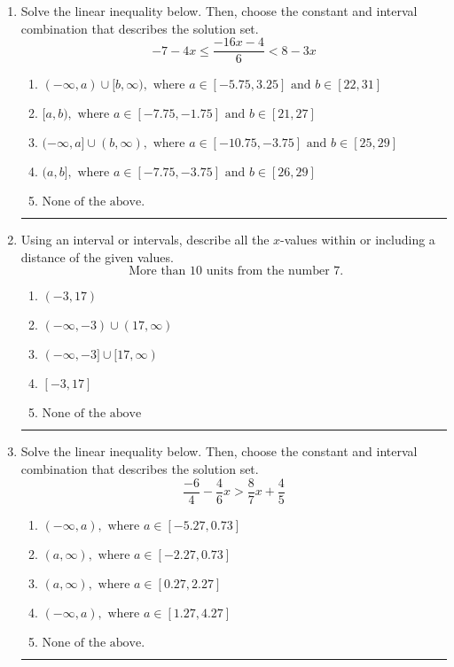 \documentclass[14pt]{extbook}
\newcommand{\litem}[1]{\item#1\hspace*{-1cm}\rule{\textwidth}{0.4pt}}
\begin{document}
\begin{enumerate}
{\begin{enumerate}[label=\Alph*.]
\end{enumerate} }
\litem{
Solve the linear inequality below. Then, choose the constant and interval combination that describes the solution set.\[ -7 - 4 x \leq \frac{-16 x - 4}{6} < 8 - 3 x \]\begin{enumerate}[label=\Alph*.]
\item \( (-\infty, a) \cup [b, \infty), \text{ where } a \in [-5.75, 3.25] \text{ and } b \in [22, 31] \)
\item \( [a, b), \text{ where } a \in [-7.75, -1.75] \text{ and } b \in [21, 27] \)
\item \( (-\infty, a] \cup (b, \infty), \text{ where } a \in [-10.75, -3.75] \text{ and } b \in [25, 29] \)
\item \( (a, b], \text{ where } a \in [-7.75, -3.75] \text{ and } b \in [26, 29] \)
\item \( \text{None of the above.} \)

\end{enumerate} }
\litem{
Using an interval or intervals, describe all the $x$-values within or including a distance of the given values.\[ \text{ More than } 10 \text{ units from the number } 7. \]\begin{enumerate}[label=\Alph*.]
\item \( (-3, 17) \)
\item \( (-\infty, -3) \cup (17, \infty) \)
\item \( (-\infty, -3] \cup [17, \infty) \)
\item \( [-3, 17] \)
\item \( \text{None of the above} \)

\end{enumerate} }
\litem{
Solve the linear inequality below. Then, choose the constant and interval combination that describes the solution set.\[ \frac{-6}{4} - \frac{4}{6} x > \frac{8}{7} x + \frac{4}{5} \]\begin{enumerate}[label=\Alph*.]
\item \( (-\infty, a), \text{ where } a \in [-5.27, 0.73] \)
\item \( (a, \infty), \text{ where } a \in [-2.27, 0.73] \)
\item \( (a, \infty), \text{ where } a \in [0.27, 2.27] \)
\item \( (-\infty, a), \text{ where } a \in [1.27, 4.27] \)
\item \( \text{None of the above}. \)


\end{enumerate}}
\end{enumerate}
\end{document}
